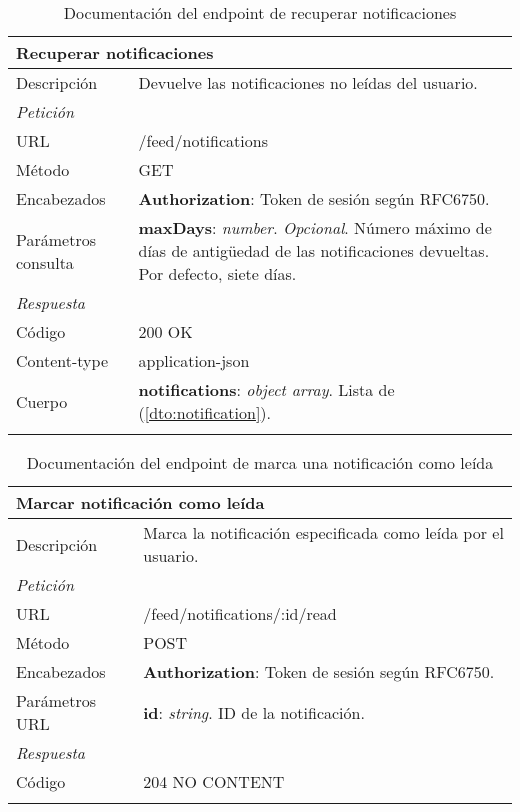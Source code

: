 \begin{longtable}{|p{} p{}|}
    \hline
    \multicolumn{2}{|l|}{\textbf{Recuperar notificaciones}} \\ \hline 
    Descripción         & Devuelve las notificaciones no leídas del usuario. \\ \hline \hline
    \multicolumn{2}{|l|}{\emph{Petición}}  \\ \hline 
    URL      & /feed/notifications \\ \hline
    Método   & GET                  \\ \hline
    Encabezados  & 
    \textbf{Authorization}: Token de sesión según RFC6750. \\ \hline
    Parámetros consulta  & 
    \textbf{maxDays}: \emph{number}. \emph{Opcional}. Número máximo de días de antigüedad de las notificaciones devueltas. Por defecto, siete días. \\ \hline \hline
    \multicolumn{2}{|l|}{\emph{Respuesta}} \\ \hline 
    Código          & 200 OK          \\ \hline
    Content-type    & application-json  \\ \hline
    Cuerpo  & 
    \textbf{notifications}: \emph{object array}. Lista de \nameref{dto:notification} (\ref{dto:notification}).
    \\ \hline 
    \caption{Documentación del endpoint de recuperar notificaciones}
    \label{api:recuperar_notificaciones}
\end{longtable}

\begin{longtable}{|p{} p{}|}
    \hline
    \multicolumn{2}{|l|}{\textbf{Marcar notificación como leída}} \\ \hline 
    Descripción         & Marca la notificación especificada como leída por el usuario. \\ \hline \hline
    \multicolumn{2}{|l|}{\emph{Petición}}  \\ \hline 
    URL      & /feed/notifications/:id/read \\ \hline
    Método   & POST                  \\ \hline
    Encabezados  & 
    \textbf{Authorization}: Token de sesión según RFC6750. \\ \hline
    Parámetros URL  & 
    \textbf{id}: \emph{string}. ID de la notificación. \\ \hline \hline
    \multicolumn{2}{|l|}{\emph{Respuesta}} \\ \hline 
    Código          & 204 NO CONTENT          \\ \hline
    \caption{Documentación del endpoint de marca una notificación como leída}
    \label{api:leer_notificacion}
\end{longtable}

